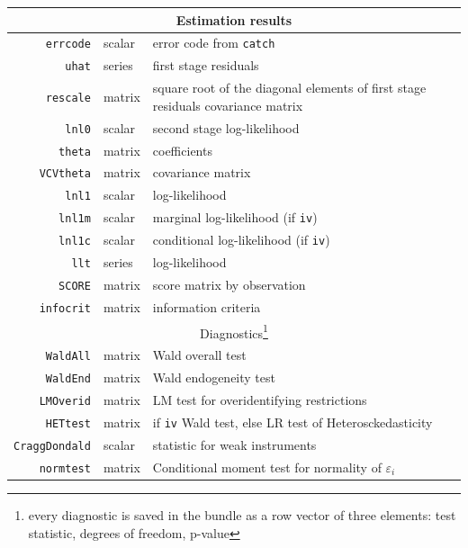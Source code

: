 \documentclass[a4paper,10pt]{article}
\begin{document}
\begin{footnotesize}
\begin{tabular}{rlp{}}
\hline
  \multicolumn{3}{c}{Estimation results} \\
  \hline  
  \texttt{errcode}   & scalar & error code from \texttt{catch} \\
  \texttt{uhat}      & series & first stage residuals
  \citep{RiversVuong1988} \\
  \texttt{rescale}   & matrix & square root of the diagonal elements
  of first stage residuals covariance matrix \\
  \texttt{lnl0}      & scalar & second stage log-likelihood 
  \citep{RiversVuong1988} \\
  \texttt{theta}     & matrix & coefficients \\
  \texttt{VCVtheta}  & matrix & covariance matrix \\
  \texttt{lnl1}      & scalar & log-likelihood  \\
  \texttt{lnl1m}     & scalar & marginal log-likelihood  (if
  \texttt{iv})\\
  \texttt{lnl1c}     & scalar & conditional log-likelihood  (if
  \texttt{iv})\\
  \texttt{llt}       & series & log-likelihood  \\
  \texttt{SCORE}     & matrix & score matrix by observation  \\
  \texttt{infocrit}  & matrix & information criteria  \\
  \hline

  \multicolumn{3}{c}{Diagnostics\footnote{
      every diagnostic is saved in the bundle as a row vector of
      three elements: test statistic, degrees of freedom, p-value}} \\
  \hline  
  \texttt{WaldAll}   & matrix & Wald overall test \\
  \texttt{WaldEnd}   & matrix & Wald endogeneity test \\
  \texttt{LMOverid}  & matrix & LM test for overidentifying
  restrictions\\
  \texttt{HETtest}   & matrix & if \texttt{iv} Wald test, else LR test
  of Heterosckedasticity \\
  \texttt{CraggDondald} & scalar  & \cite{CraggDonald1993} statistic
  for weak instruments\\
  \texttt{normtest}  & matrix & Conditional moment test for normality
  of $\varepsilon_i$ \cite{ChesherIrish1987} \\
\hline
\end{tabular}
\end{footnotesize}
\end{document}
